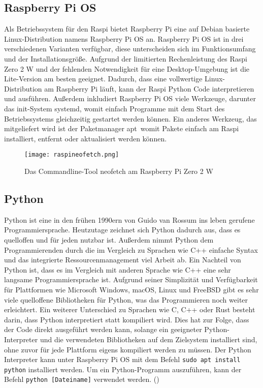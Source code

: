 \subsection{Raspberry Pi OS}
\label{subsec:tRasPiOS}
Als Betriebssystem für den \ac{Raspi} bietet Raspberry Pi eine auf Debian basierte Linux-Distribution namens Raspberry Pi \ac{OS} an. Raspberry Pi \ac{OS} ist in drei verschiedenen Varianten verfügbar, diese unterscheiden sich im Funktionsumfang und der Installationsgröße. Aufgrund der limitierten Rechenleistung des \ac{Raspi} Zero 2 W und der fehlenden Notwendigkeit für eine Desktop-Umgebung ist die Lite-Version am besten geeignet. Dadurch, dass eine vollwertige Linux-Distribution am Raspberry Pi läuft, kann der \ac{Raspi} Python Code interpretieren und ausführen. Außerdem inkludiert Raspberry Pi OS viele Werkzeuge, darunter das init-System \glqq systemd\grqq , womit einfach Programme mit dem Start des Betriebssystems gleichzeitig gestartet werden können. Ein anderes Werkzeug, das mitgeliefert wird ist der Paketmanager \glqq apt\grqq\ womit Pakete einfach am \ac{Raspi} installiert, entfernt oder aktualisiert werden können.
\newpage
\begin{figure}[h]
\centering
\texttt{[image: raspineofetch.png]}
\caption{Das Commandline-Tool neofetch am Raspberry Pi Zero 2 W}
\label{fig:pineofetch}
\end{figure}

\subsection{Python}
\label{subsec:tPython}
Python ist eine in den frühen 1990ern von Guido van Rossum ins leben gerufene Programmiersprache. Heutzutage zeichnet sich Python dadurch aus, dass es quelloffen und für jeden nutzbar ist. Außerdem nimmt Python dem Programmierenden durch die im Vergleich zu Sprachen wie C++ einfache Syntax und das integrierte Ressourcenmanagement viel Arbeit ab. Ein Nachteil von Python ist, dass es im Vergleich mit anderen Sprache wie C++ eine sehr langsame Programmiersprache ist. Aufgrund seiner Simplizität und Verfügbarkeit für Plattformen wie Microsoft Windows, macOS, Linux und FreeBSD gibt es sehr viele quelloffene Bibliotheken für Python, was das Programmieren noch weiter erleichtert. Ein weiterer Unterschied zu Sprachen wie C, C++ oder Rust besteht darin, dass Python interpretiert statt kompiliert wird. Dies hat zur Folge, dass der Code direkt ausgeführt werden kann, solange ein geeigneter Python-Interpreter und die verwendeten Bibliotheken auf dem Zielsystem installiert sind, ohne zuvor für jede Plattform eigens kompiliert werden zu müssen. Der Python Interpreter kann unter Raspberry Pi OS mit dem Befehl \verb|sudo apt install python| installiert werden. Um ein Python-Programm auszuführen, kann der Befehl \verb|python [Dateiname]| verwendet werden.
(\cite{matthes-2019})

